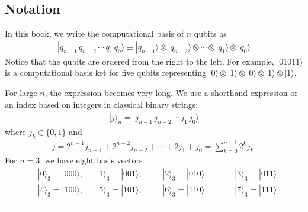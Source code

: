 \documentclass[letterpaper,10pt,english]{jupyterBook}
\begin{document}
\subsection{Notation}
\label{\detokenize{composites/morequbits:notation}}\label{\detokenize{composites/morequbits:ssec-notations}}
\sphinxAtStartPar
In this book, we write the computational basis of \(n\) qubits as
\begin{equation*}
\begin{split}
|q_{n-1}\, q_{n-2}\, \cdots\, q_1\, q_0\rangle \equiv |q_{n-1}\rangle \otimes |q_{n-2}\rangle \otimes \cdots \otimes |q_1\rangle \otimes |q_0\rangle
\end{split}
\end{equation*}
\sphinxAtStartPar
Notice that the qubits are ordered from the right to the left.  For example, \(|01011\rangle\) is a computational basis ket for five qubits representing \(|0\rangle \otimes |1\rangle \otimes |0 \rangle \otimes |1\rangle \otimes |1\rangle\).

\sphinxAtStartPar
For large \(n\), the expression becomes very long. We use a shorthand expression or an index based on integers in classical binary strings:
\begin{equation*}
\begin{split}
|j\rangle_n = |j_{n-1}\, j_{n-2}\, \cdots\, j_1\, j_0\rangle
\end{split}
\end{equation*}
\sphinxAtStartPar
where \(j_k \in \{0,1\}\) and
\begin{equation*}
\begin{split}
j = 2^{n-1} j_{n-1} + 2^{n-2} j_{n-2} + \cdots + 2 j_1 + j_0 = \sum_{k=0}^{n-1} 2^k j_k.
\end{split}
\end{equation*}
\sphinxAtStartPar
For \(n=3\), we have eight basis vectors
\begin{align}
&|0\rangle_3 = |000\rangle, && |1\rangle_3 = |001\rangle, &&& |2\rangle_3 = |010\rangle, &&&&|3\rangle_3 = |011\rangle\\
&|4\rangle_3 = |100\rangle, && |5\rangle_3 = |101\rangle, &&& |6\rangle_3 = |110\rangle, &&&&|7\rangle_3 = |111\rangle
\end{align}

\bigskip\hrule\bigskip
\end{document}
